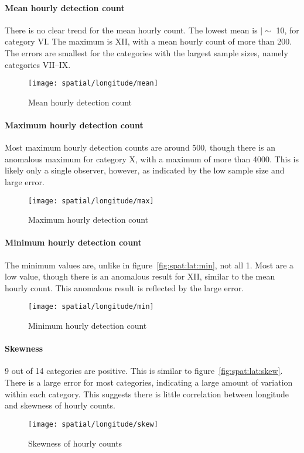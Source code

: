 \paragraph{Mean hourly detection count\\}
There is no clear trend for the mean hourly count. The lowest mean is $|{\sim}$ 10, for category VI. The maximum is XII, with a mean hourly count of more than 200. The errors are smallest for the categories with the largest sample sizes, namely categories VII--IX.
\begin{figure}[h!]
	\centering
	\texttt{[image: spatial/longitude/mean]}
	\caption{Mean hourly detection count
		\label{fig:spat:lon:mean}}
\end{figure}
\paragraph{Maximum hourly detection count\\}
Most maximum hourly detection counts are around 500, though there is an anomalous maximum for category X, with a maximum of more than 4000. This is likely only a single observer, however, as indicated by the low sample size and large error.
\begin{figure}[h!]
	\centering
	\texttt{[image: spatial/longitude/max]}
	\caption{Maximum hourly detection count
		\label{fig:spat:lon:max}}
\end{figure}
\paragraph{Minimum hourly detection count\\}
The minimum values are, unlike in figure~\ref{fig:spat:lat:min}, not all 1. Most are a low value, though there is an anomalous result for XII, similar to the mean hourly count. This anomalous result is reflected by the large error.
\begin{figure}[h!]
	\centering
	\texttt{[image: spatial/longitude/min]}
	\caption{Minimum hourly detection count 
		\label{fig:spat:long:min}}
\end{figure}
\paragraph{Skewness\\}
9 out of 14 categories are positive. This is similar to figure~\ref{fig:spat:lat:skew}. There is a large error for most categories, indicating a large amount of variation within each category. This suggests there is little correlation between longitude and skewness of hourly counts.
\begin{figure}[h!]
	\centering
	\texttt{[image: spatial/longitude/skew]}
	\caption{Skewness of hourly counts
		\label{fig:spat:lon:skew}}
\end{figure}
